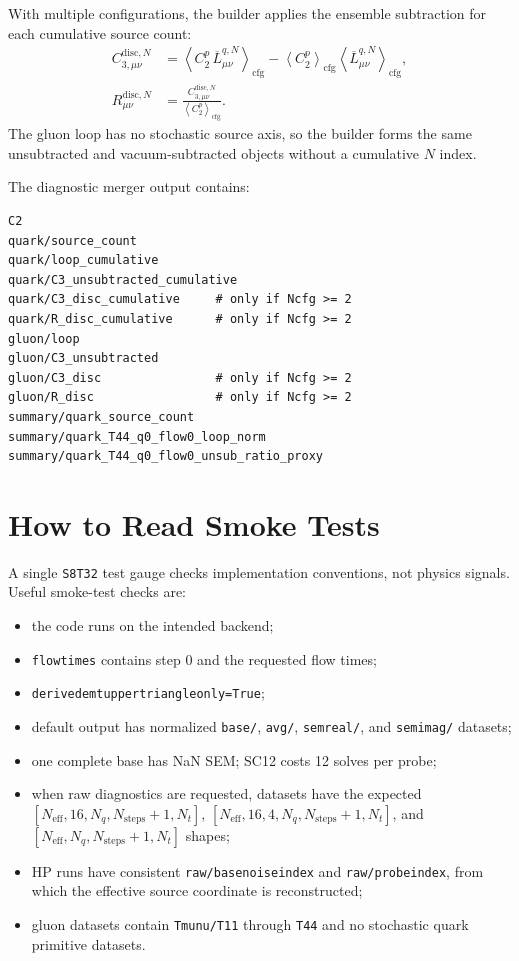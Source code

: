 \documentclass[11pt,a4paper]{article}
\newcommand{\code}[1]{\texttt{\begingroup\def\_{\textunderscore\allowbreak}#1\endgroup}}
\begin{document}
With multiple configurations, the builder applies the ensemble subtraction for
each cumulative source count:
\begin{align}
  C^{\mathrm{disc},N}_{3,\mu\nu}
  &=
  \left\langle
    C_2^p\,\overline{L}^{q,N}_{\mu\nu}
  \right\rangle_{\mathrm{cfg}}
  -
  \left\langle C_2^p \right\rangle_{\mathrm{cfg}}
  \left\langle
    \overline{L}^{q,N}_{\mu\nu}
  \right\rangle_{\mathrm{cfg}},
  \\
  R^{\mathrm{disc},N}_{\mu\nu}
  &=
  \frac{
    C^{\mathrm{disc},N}_{3,\mu\nu}
  }{
    \left\langle C_2^p \right\rangle_{\mathrm{cfg}}
  }.
  \label{eq:cumulative_ratio}
\end{align}
The gluon loop has no stochastic source axis, so the builder forms the same
unsubtracted and vacuum-subtracted objects without a cumulative \(N\) index.

The diagnostic merger output contains:
\begin{verbatim}
C2
quark/source_count
quark/loop_cumulative
quark/C3_unsubtracted_cumulative
quark/C3_disc_cumulative     # only if Ncfg >= 2
quark/R_disc_cumulative      # only if Ncfg >= 2
gluon/loop
gluon/C3_unsubtracted
gluon/C3_disc                # only if Ncfg >= 2
gluon/R_disc                 # only if Ncfg >= 2
summary/quark_source_count
summary/quark_T44_q0_flow0_loop_norm
summary/quark_T44_q0_flow0_unsub_ratio_proxy
\end{verbatim}

\section{How to Read Smoke Tests}

A single \code{S8T32} test gauge checks implementation conventions, not physics
signals.  Useful smoke-test checks are:
\begin{itemize}
  \item the code runs on the intended backend;
  \item \code{flow\_times} contains step \(0\) and the requested flow times;
  \item \code{derived\_emt\_upper\_triangle\_only=True};
  \item default output has normalized \code{base/}, \code{avg/},
        \code{sem\_real/}, and \code{sem\_imag/} datasets;
  \item one complete base has NaN SEM; SC12 costs 12 solves per probe;
  \item when raw diagnostics are requested, datasets have the expected
        \([N_{\mathrm{eff}},16,N_q,N_{\mathrm{steps}}+1,N_t]\),
        \([N_{\mathrm{eff}},16,4,N_q,N_{\mathrm{steps}}+1,N_t]\), and
        \([N_{\mathrm{eff}},N_q,N_{\mathrm{steps}}+1,N_t]\) shapes;
  \item HP runs have consistent \code{raw/base\_noise\_index} and
        \code{raw/probe\_index}, from which the effective source coordinate is
        reconstructed;
  \item gluon datasets contain \code{Tmunu/T11} through \code{T44} and no
        stochastic quark primitive datasets.
\end{itemize}
\end{document}
